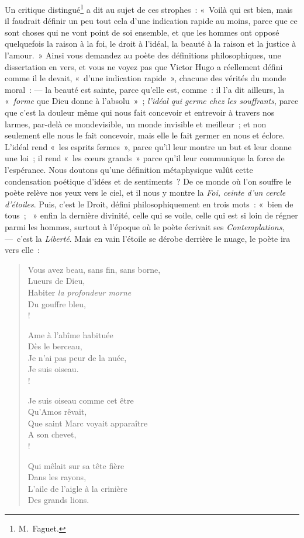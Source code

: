 \documentclass[french,twoside]{book} %
\begin{document}
\noindent Un critique distingué\footnote{M. Faguet.} a dit au sujet de ces strophes : « Voilà qui est bien, mais il faudrait définir un peu tout cela d’une indication rapide au moins, parce que ce sont choses qui ne vont point de soi ensemble, et que les hommes ont opposé quelquefois la raison à la foi, le droit à l’idéal, la beauté à la raison et la justice à l’amour. » Ainsi vous demandez au poète des définitions philosophiques, une dissertation en vers, et vous ne voyez pas que Victor Hugo a réellement défini comme il le devait, « d’une indication rapide », chacune des vérités du monde moral : — la beauté est sainte, parce qu’elle est, comme : il l’a dit ailleurs, la « \emph{forme} que Dieu donne à l’absolu » ; \emph{l’idéal qui germe chez les souffrants}, parce que c’est la douleur même qui nous fait concevoir et entrevoir à travers nos larmes, par-delà ce mondevisible, un monde invisible et meilleur ; et non seulement elle nous le fait concevoir, mais elle le fait germer en nous et éclore. L’idéal rend « les esprits fermes », parce qu’il leur montre un but et leur donne une loi ; il rend « les cœurs grands » parce qu’il leur communique la force de l’espérance. Nous doutons qu’une définition métaphysique valût cette condensation poétique d’idées et de sentiments ? De ce monde où l’on souffre le poète relève nos yeux vers le ciel, et il nous y montre la \emph{Foi, ceinte d’un cercle d’étoiles}. Puis, c’est le Droit, défini philosophiquement en trois mots : « bien de tous ;  » enfin la dernière divinité, celle qui se voile, celle qui est si loin de régner parmi les hommes, surtout à l’époque où le poète écrivait ses \emph{Contemplations}, — c’est la \emph{Liberté}. Mais en vain l’étoile se dérobe derrière le nuage, le poète ira vers elle :\par


\begin{verse}
Vous avez beau, sans fin, sans borne,\\
Lueurs de Dieu,\\
Habiter \emph{la profondeur morne}\\
Du gouffre bleu,\\!

Ame à l’abîme habituée\\
Dès le berceau,\\
Je n’ai pas peur de la nuée,\\
Je suis oiseau.\\!

Je suis oiseau comme cet être\\
Qu’Amos rêvait,\\
Que saint Marc voyait apparaître\\
A son chevet,\\!

Qui mêlait sur sa tête fière\\
Dans les rayons,\\
L’aile de l’aigle à la crinière\\
Des grands lions.\\
\end{verse}
\end{document}
